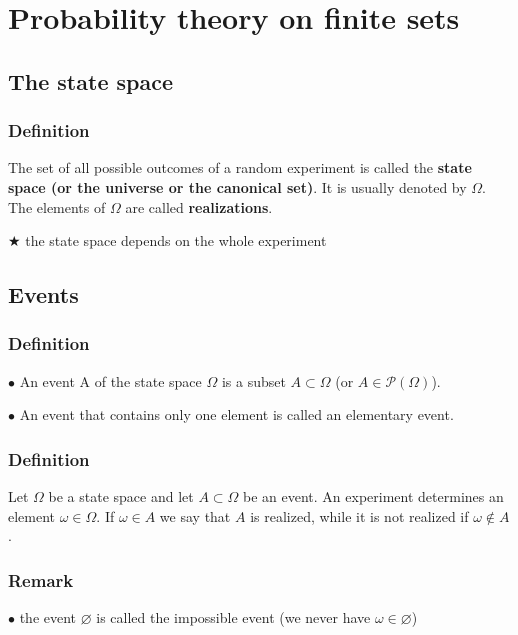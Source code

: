 \section{Probability theory on finite sets}
        \subsection{The state space}
            \subsubsection{Definition}
                The set of all possible outcomes of a random experiment is called the \textbf{state space (or the universe or the canonical set)}. It is usually denoted by $\Omega$. The elements of $\Omega$ are called \textbf{realizations}.

                \vspace{5pt}

                $\bigstar$ the state space depends on the whole experiment

        \subsection{Events}
            \subsubsection{Definition}
                $\bullet$ An event A of the state space $\Omega$ is a subset $A \subset \Omega$ (or $A\in\mathcal{P}(\Omega)$).

                \noindent$\bullet$ An event that contains only one element is called an elementary event.

            \subsubsection{Definition}
                Let $\Omega$ be a state space and let $A \subset \Omega$ be an event. An experiment determines an element $\omega \in \Omega$. If $\omega\in A$ we say that $A$ is realized, while it is not realized if $\omega \notin A$.

            \subsubsection{Remark}
                $\bullet$ the event $\varnothing$ is called the impossible event (we never have $\omega \in \varnothing$)

